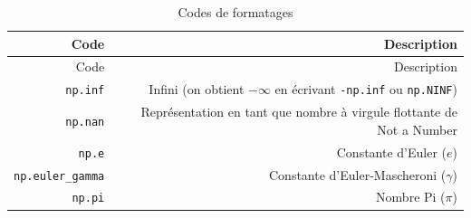 \documentclass[12pt,]{book}
\numberwithin{equation}{section}
\numberwithin{countremarque}{section}
\begin{document}
\begin{longtable}[]{@{}rr@{}}
\caption{\label{tab:constantes-numpy} Codes de formatages}\tabularnewline
\toprule
\begin{minipage}[b]{0.18\columnwidth}\raggedleft\strut
Code\strut
\end{minipage} & \begin{minipage}[b]{0.71\columnwidth}\raggedleft\strut
Description\strut
\end{minipage}\tabularnewline
\midrule
\endfirsthead
\toprule
\begin{minipage}[b]{0.18\columnwidth}\raggedleft\strut
Code\strut
\end{minipage} & \begin{minipage}[b]{0.71\columnwidth}\raggedleft\strut
Description\strut
\end{minipage}\tabularnewline
\midrule
\endhead
\begin{minipage}[t]{0.18\columnwidth}\raggedleft\strut
\texttt{np.inf}\strut
\end{minipage} & \begin{minipage}[t]{0.71\columnwidth}\raggedleft\strut
Infini (on obtient \(-\infty\) en écrivant \texttt{-np.inf} ou
\texttt{np.NINF})\strut
\end{minipage}\tabularnewline
\begin{minipage}[t]{0.18\columnwidth}\raggedleft\strut
\texttt{np.nan}\strut
\end{minipage} & \begin{minipage}[t]{0.71\columnwidth}\raggedleft\strut
Représentation en tant que nombre à virgule flottante de Not a
Number\strut
\end{minipage}\tabularnewline
\begin{minipage}[t]{0.18\columnwidth}\raggedleft\strut
\texttt{np.e}\strut
\end{minipage} & \begin{minipage}[t]{0.71\columnwidth}\raggedleft\strut
Constante d'Euler (\(e\))\strut
\end{minipage}\tabularnewline
\begin{minipage}[t]{0.18\columnwidth}\raggedleft\strut
\texttt{np.euler\_gamma}\strut
\end{minipage} & \begin{minipage}[t]{0.71\columnwidth}\raggedleft\strut
Constante d'Euler-Mascheroni (\(\gamma\))\strut
\end{minipage}\tabularnewline
\begin{minipage}[t]{0.18\columnwidth}\raggedleft\strut
\texttt{np.pi}\strut
\end{minipage} & \begin{minipage}[t]{0.71\columnwidth}\raggedleft\strut
Nombre Pi (\(\pi\))\strut
\end{minipage}\tabularnewline
\bottomrule
\end{longtable}
\end{document}
